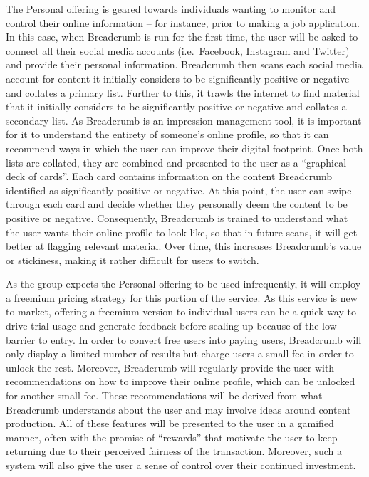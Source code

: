 The Personal offering is geared towards individuals wanting to monitor and control their online information -- for instance, prior to making a job application. In this case, when Breadcrumb is run for the first time, the user will be asked to connect all their social media accounts (i.e.~Facebook, Instagram and Twitter) and provide their personal information. Breadcrumb then scans each social media account for content it initially considers to be significantly positive or negative and collates a primary list. Further to this, it trawls the internet to find material that it initially considers to be significantly positive or negative and collates a secondary list. As Breadcrumb is an impression management tool, it is important for it to understand the entirety of someone’s online profile, so that it can recommend ways in which the user can improve their digital footprint. Once both lists are collated, they are combined and presented to the user as a ``graphical deck of cards''. Each card contains information on the content Breadcrumb identified as significantly positive or negative. At this point, the user can swipe through each card and decide whether they personally deem the content to be positive or negative. Consequently, Breadcrumb is trained to understand what the user wants their online profile to look like, so that in future scans, it will get better at flagging relevant material. Over time, this increases Breadcrumb’s value or stickiness, making it rather difficult for users to switch.

As the group expects the Personal offering to be used infrequently, it will employ a freemium pricing strategy for this portion of the service. As this service is new to market, offering a freemium version to individual users can be a quick way to drive trial usage and generate feedback before scaling up because of the low barrier to entry. In order to convert free users into paying users, Breadcrumb will only display a limited number of results but charge users a small fee in order to unlock the rest. Moreover, Breadcrumb will regularly provide the user with recommendations on how to improve their online profile, which can be unlocked for another small fee. These recommendations will be derived from what Breadcrumb understands about the user and may involve ideas around content production. All of these features will be presented to the user in a gamified manner, often with the promise of ``rewards'' that motivate the user to keep returning due to their perceived fairness of the transaction. Moreover, such a system will also give the user a sense of control over their continued investment.


